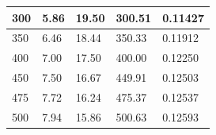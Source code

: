 \documentclass[twocolumn,english]{IEEEtran}
\theoremstyle{plain}
\theoremstyle{plain}
\begin{document}
\begin{table}[htpb]
\begin{tabular}{|l|l|l|l|l|}
300                                                                                              & 5.86                                                                                & 19.50                                                                                & 300.51                                                                                               & 0.11427                              \\ \hline
350                                                                                              & 6.46                                                                                & 18.44                                                                                & 350.33                                                                                               & 0.11912                              \\ \hline
400                                                                                              & 7.00                                                                                & 17.50                                                                                & 400.00                                                                                               & 0.12250                              \\ \hline
450                                                                                              & 7.50                                                                                & 16.67                                                                                & 449.91                                                                                               & 0.12503                              \\ \hline
475                                                                                              & 7.72                                                                                & 16.24                                                                                & 475.37                                                                                               & 0.12537                              \\ \hline
500                                                                                              & 7.94                                                                                & 15.86                                                                                & 500.63                                                                                               & 0.12593                              \\ \hline

\end{tabular}
\end{table}
\end{document}
